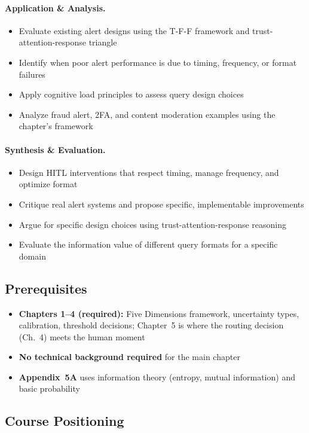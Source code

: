 \paragraph{Application \& Analysis.}
\begin{itemize}
    \item Evaluate existing alert designs using the T-F-F framework and trust-attention-response triangle
    \item Identify when poor alert performance is due to timing, frequency, or format failures
    \item Apply cognitive load principles to assess query design choices
    \item Analyze fraud alert, 2FA, and content moderation examples using the chapter's framework
\end{itemize}

\paragraph{Synthesis \& Evaluation.}
\begin{itemize}
    \item Design HITL interventions that respect timing, manage frequency, and optimize format
    \item Critique real alert systems and propose specific, implementable improvements
    \item Argue for specific design choices using trust-attention-response reasoning
    \item Evaluate the information value of different query formats for a specific domain
\end{itemize}

\subsection{Prerequisites}
\begin{itemize}
    \item \textbf{Chapters 1--4 (required):} Five Dimensions framework, uncertainty types, calibration, threshold decisions; Chapter~5 is where the routing decision (Ch.\ 4) meets the human moment
    \item \textbf{No technical background required} for the main chapter
    \item \textbf{Appendix~5A} uses information theory (entropy, mutual information) and basic probability
\end{itemize}

\subsection{Course Positioning}

